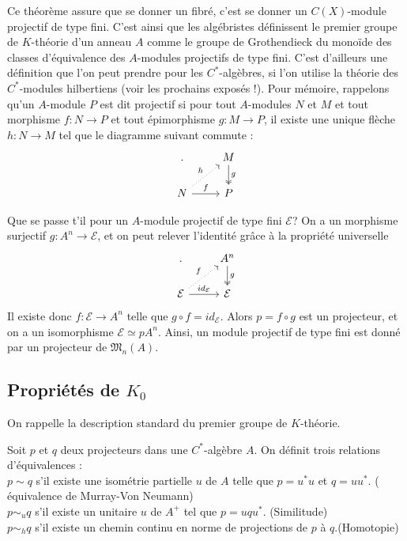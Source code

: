 Ce théorème assure que se donner un fibré, c'est se donner un $C(X)$-module projectif de type fini. C'est ainsi que les algébristes définissent le premier groupe de $K$-théorie d'un anneau $A$ comme le groupe de Grothendieck du monoïde des classes d'équivalence des $A$-modules projectifs de type fini. C'est d'ailleurs une définition que l'on peut prendre pour les $C^*$-algèbres, si l'on utilise la théorie des $C^*$-modules hilbertiens (voir les prochains exposés !). Pour mémoire, rappelons qu'un $A$-module $P$ est dit projectif si pour tout $A$-modules $N$ et $M$ et tout morphisme $f : N\rightarrow P$ et tout épimorphisme $g: M\rightarrow P$, il existe une unique flèche $h : N\rightarrow M$ tel que le diagramme suivant commute :
\[\begin{tikzcd}  . & M \arrow[two heads]{d}{g} \\
	N \arrow[dotted]{ur}{h}\arrow{r}{f} & P
\end{tikzcd}\]

Que se passe t'il pour un $A$-module projectif de type fini $\mathcal E $? On a un morphisme surjectif $g : A^n \rightarrow \mathcal E$, et on peut relever l'identité grâce à la propriété universelle
\[\begin{tikzcd}
 . 		& A^n \arrow[two heads]{d}{g} \\
	\mathcal E \arrow[dotted]{ur}{f}\arrow{r}{id_{\mathcal E}} & \mathcal E
\end{tikzcd}\]
Il existe donc $f : \mathcal E \rightarrow A^n$ telle que $g\circ f = id_{\mathcal E}$. Alors $p = f\circ g$ est un projecteur, et on a un isomorphisme $ \mathcal E \simeq pA^n$. Ainsi, un module projectif de type fini est donné par un projecteur de $\mathfrak M_n (A)$.

\subsection{Propriétés de $K_0$}

On rappelle la description standard du premier groupe de $K$-théorie. 
\begin{definition}
Soit $p$ et $q$ deux projecteurs dans une $C^*$-algèbre $A$. On définit trois relations d'équivalences :\\
$p\sim q$ s'il existe une isométrie partielle $u$ de $A$ telle que $p=u^*u $ et $q=uu^*$. ( équivalence de Murray-Von Neumann)\\
$p\sim_u q$ s'il existe un unitaire $u$ de $A^+$ tel que $p=uqu^*$. (Similitude)\\
$p\sim_h q$ s'il existe un chemin continu en norme de projections de $p$ à $q$.(Homotopie)\\
\end{definition}

